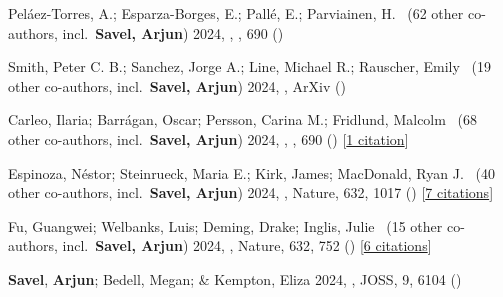 \item[{\color{numcolor}\scriptsize40}] Pel{\'a}ez-Torres, A.; Esparza-Borges, E.; Pall{\'e}, E.; Parviainen, H. \etal\ ({62} other co-authors, incl.\ \textbf{Savel, Arjun}) 2024, , \aanda, {690} ()

\item[{\color{numcolor}\scriptsize39}] Smith, Peter C. B.; Sanchez, Jorge A.; Line, Michael R.; Rauscher, Emily \etal\ ({19} other co-authors, incl.\ \textbf{Savel, Arjun}) 2024, , ArXiv ()

\item[{\color{numcolor}\scriptsize38}] Carleo, Ilaria; Barr{\'a}gan, Oscar; Persson, Carina M.; Fridlund, Malcolm \etal\ ({68} other co-authors, incl.\ \textbf{Savel, Arjun}) 2024, , \aanda, {690} () [\href{https://ui.adsabs.harvard.edu/abs/2024A&A...690A..18C}{1 citation}]

\item[{\color{numcolor}\scriptsize37}] Espinoza, N{\'e}stor; Steinrueck, Maria E.; Kirk, James; MacDonald, Ryan J. \etal\ ({40} other co-authors, incl.\ \textbf{Savel, Arjun}) 2024, , Nature, {632}, 1017 () [\href{https://ui.adsabs.harvard.edu/abs/2024Natur.632.1017E}{7 citations}]

\item[{\color{numcolor}\scriptsize36}] Fu, Guangwei; Welbanks, Luis; Deming, Drake; Inglis, Julie \etal\ ({15} other co-authors, incl.\ \textbf{Savel, Arjun}) 2024, , Nature, {632}, 752 () [\href{https://ui.adsabs.harvard.edu/abs/2024Natur.632..752F}{6 citations}]

\item[{\color{numcolor}\scriptsize35}] \textbf{Savel}, \textbf{Arjun}; Bedell, Megan; \& Kempton, Eliza 2024, , JOSS, {9}, 6104 ()

